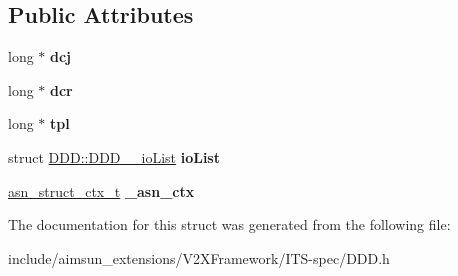\subsection*{Public Attributes}
\begin{DoxyCompactItemize}
\item 
long $\ast$ {\bfseries dcj}\hypertarget{structDDD_a13ad705236504bf5c427e73ade6be973}{}\label{structDDD_a13ad705236504bf5c427e73ade6be973}

\item 
long $\ast$ {\bfseries dcr}\hypertarget{structDDD_a3eb7f0c8ae69393bea5ab8fd8ffa0e68}{}\label{structDDD_a3eb7f0c8ae69393bea5ab8fd8ffa0e68}

\item 
long $\ast$ {\bfseries tpl}\hypertarget{structDDD_a8ef69dead898e60a6b76d433729e1fd4}{}\label{structDDD_a8ef69dead898e60a6b76d433729e1fd4}

\item 
struct \hyperlink{structDDD_1_1DDD____ioList}{D\+D\+D\+::\+D\+D\+D\+\_\+\+\_\+io\+List} {\bfseries io\+List}\hypertarget{structDDD_a7af98b5802182556a07182e0c7a2a552}{}\label{structDDD_a7af98b5802182556a07182e0c7a2a552}

\item 
\hyperlink{structasn__struct__ctx__s}{asn\+\_\+struct\+\_\+ctx\+\_\+t} {\bfseries \+\_\+asn\+\_\+ctx}\hypertarget{structDDD_a6d2d1a7764b65e0f170a7538b081bd0b}{}\label{structDDD_a6d2d1a7764b65e0f170a7538b081bd0b}

\end{DoxyCompactItemize}


The documentation for this struct was generated from the following file\+:\begin{DoxyCompactItemize}
\item 
include/aimsun\+\_\+extensions/\+V2\+X\+Framework/\+I\+T\+S-\/spec/D\+D\+D.\+h\end{DoxyCompactItemize}
